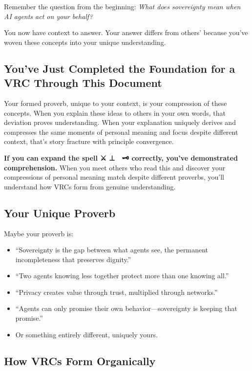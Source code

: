 \documentclass[
  11pt,
]{article}
\begin{document}
Remember the question from the beginning: \emph{What does sovereignty
mean when AI agents act on your behalf?}

You now have context to answer. Your answer differs from others' because
you've woven these concepts into your unique understanding.

\subsection{You've Just Completed the Foundation for a VRC Through This
Document}\label{youve-just-completed-the-foundation-for-a-vrc-through-this-document}

Your formed proverb, unique to your context, is your compression of
these concepts. When you explain these ideas to others in your own
words, that deviation proves understanding. When your explanation
uniquely derives and compresses the same moments of personal meaning and
focus despite different context, that's story fracture with principle
convergence.

\textbf{If you can expand the spell ⚔️ ⊥ 🔮 \textbar{} 🗝️ correctly,
you've demonstrated comprehension.} When you meet others who read this
and discover your compressions of personal meaning match despite
different proverbs, you'll understand how VRCs form from genuine
understanding.

\subsection{Your Unique Proverb}\label{your-unique-proverb}

Maybe your proverb is:

\begin{itemize}
\item
  ``Sovereignty is the gap between what agents see, the permanent
  incompleteness that preserves dignity.''
\item
  ``Two agents knowing less together protect more than one knowing
  all.''
\item
  ``Privacy creates value through trust, multiplied through networks.''
\item
  ``Agents can only promise their own behavior---sovereignty is keeping
  that promise.''
\item
  Or something entirely different, uniquely yours.
\end{itemize}

\subsection{How VRCs Form Organically}\label{how-vrcs-form-organically}
\end{document}
